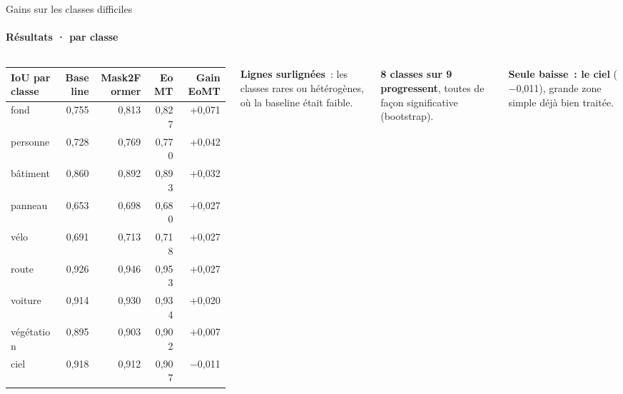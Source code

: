 \documentclass[aspectratio=169,9pt,xcolor=table,t]{beamer}
\newcommand{\cvsource}{}
\newcommand{\setsource}[1]{\gdef\cvsource{\ \textperiodcentered\ #1}}
\begin{document}
\begin{frame}{Gains sur les classes difficiles}
\framesubtitle{Résultats · par classe}
\setsource{IoU sur les 500 images de validation}
\vspace{1mm}
\begin{columns}[T,onlytextwidth]
\small
\renewcommand{\arraystretch}{1.25}
\begin{tabular}{@{}lrrrr@{}}
\toprule
\textbf{IoU par classe} & \textbf{Baseline} & \textbf{Mask2Former} & \textbf{EoMT} & \textbf{Gain EoMT}\\
\midrule
\rowcolor{orangetint} fond & 0,755 & 0,813 & 0,827 & +0,071\\
\rowcolor{orangetint} personne & 0,728 & 0,769 & 0,770 & +0,042\\
bâtiment & 0,860 & 0,892 & 0,893 & +0,032\\
\rowcolor{orangetint} panneau & 0,653 & 0,698 & 0,680 & +0,027\\
\rowcolor{orangetint} vélo & 0,691 & 0,713 & 0,718 & +0,027\\
route & 0,926 & 0,946 & 0,953 & +0,027\\
voiture & 0,914 & 0,930 & 0,934 & +0,020\\
végétation & 0,895 & 0,903 & 0,902 & +0,007\\
ciel & 0,918 & 0,912 & 0,907 & $-$0,011\\
\bottomrule
\end{tabular}
\begin{card}\small\textbf{Lignes surlignées}~: les classes rares ou hétérogènes, où la baseline était faible.\end{card}\par\vspace{2.5mm}
\begin{card}\small\textbf{8 classes sur 9 progressent}, toutes de façon significative (bootstrap).\end{card}\par\vspace{2.5mm}
\begin{card}\small\textbf{Seule baisse~: le ciel} ($-$0,011), grande zone simple déjà bien traitée.\end{card}
\end{columns}
\end{frame}
\end{document}
